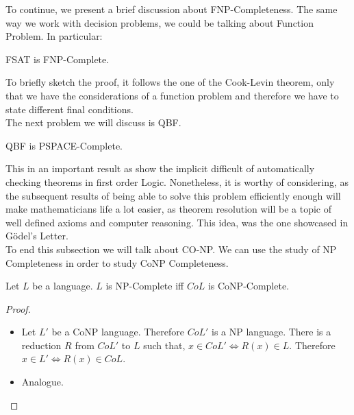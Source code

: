 


To continue,  we  present a brief discussion about FNP-Completeness. The same way we work with decision problems, we could be talking about Function Problem. In particular:


\begin{theorem} FSAT is FNP-Complete.  
\end{theorem}
To briefly sketch the proof, it  follows the one of the Cook-Levin theorem, only that we have the considerations of a function problem and therefore we have to state different final conditions.\\

The next problem we will discuss is QBF.

\begin{theorem} QBF is PSPACE-Complete.
\end{theorem}

This in an important result as show the implicit difficult of automatically checking theorems in first order Logic. Nonetheless, it is worthy of considering, as the subsequent results of being able to solve this problem efficiently enough will make mathematicians life a lot easier, as theorem resolution will be a topic of well defined axioms and computer reasoning. This idea, was the one showcased in Gödel's Letter. \\

To end this subsection we will talk about CO-NP. We can use the study of NP Completeness in order to study CoNP Completeness.

\begin{proposition}
  Let $L$ be a language. $L$ is NP-Complete iff $CoL$ is CoNP-Complete.
\end{proposition}

\begin{proof}  \hfill
  \begin{itemize}
  \item[\fbox{$\Rightarrow$}] 
    Let $L'$ be a CoNP language. Therefore $CoL'$ is a NP language. There is a reduction $R$ from $CoL'$ to $L$ such that, $x \in CoL' \iff R(x) \in L$. Therefore $x \in L' \iff R(x) \in CoL$.
  \item[\fbox{$\Leftarrow$}] Analogue.
  \end{itemize}
\end{proof}

